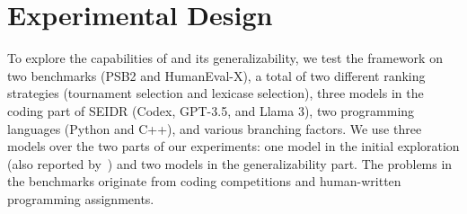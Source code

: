 \section{Experimental Design}
\label{sec:eval}

To explore the capabilities of \method{} and its generalizability, we test the framework on two benchmarks (PSB2 and
HumanEval-X), a total of two different ranking strategies (tournament selection and lexicase selection),
three models in the coding part of SEIDR (Codex, GPT-3.5, and Llama 3), two programming languages (Python and C++), and various branching factors.
We use three models over the two parts of our experiments: one model in the initial exploration (also reported by~\cite{liventsev2023:fully}) and two models in the generalizability part.
The problems in the benchmarks originate from coding competitions and human-written programming assignments. 


